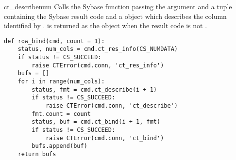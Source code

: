 \begin{methoddesc}[CS_COMMAND]{ct_describe}{num}
Calls the Sybase  function passing the
 argument and a tuple containing the Sybase result code and
a  object which describes the column identified by
.  is returned as the  object
when the result code is not .

\begin{verbatim}
def row_bind(cmd, count = 1):
    status, num_cols = cmd.ct_res_info(CS_NUMDATA)
    if status != CS_SUCCEED:
        raise CTError(cmd.conn, 'ct_res_info')
    bufs = []
    for i in range(num_cols):
        status, fmt = cmd.ct_describe(i + 1)
        if status != CS_SUCCEED:
            raise CTError(cmd.conn, 'ct_describe')
        fmt.count = count
        status, buf = cmd.ct_bind(i + 1, fmt)
        if status != CS_SUCCEED:
            raise CTError(cmd.conn, 'ct_bind')
        bufs.append(buf)
    return bufs
\end{verbatim}
\end{methoddesc}


